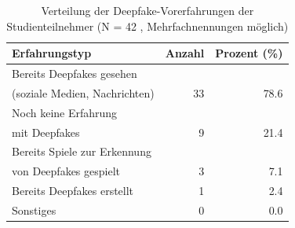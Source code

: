 \begin{table}[htbp]
\centering
\caption{Verteilung der Deepfake-Vorerfahrungen der Studienteilnehmer (N = 42 , Mehrfachnennungen möglich)} 
\label{tab:deepfake_experience}
\begin{tabular}{lrr}
  \toprule
Erfahrungstyp & Anzahl & Prozent (\%) \\ 
  \midrule
Bereits Deepfakes gesehen\\(soziale Medien, Nachrichten) & 33 & 78.6 \\ 
  Noch keine Erfahrung\\mit Deepfakes & 9 & 21.4 \\ 
  Bereits Spiele zur Erkennung\\von Deepfakes gespielt & 3 & 7.1 \\ 
  Bereits Deepfakes erstellt & 1 & 2.4 \\ 
  Sonstiges & 0 & 0.0 \\ 
   \bottomrule
\end{tabular}
\end{table}
